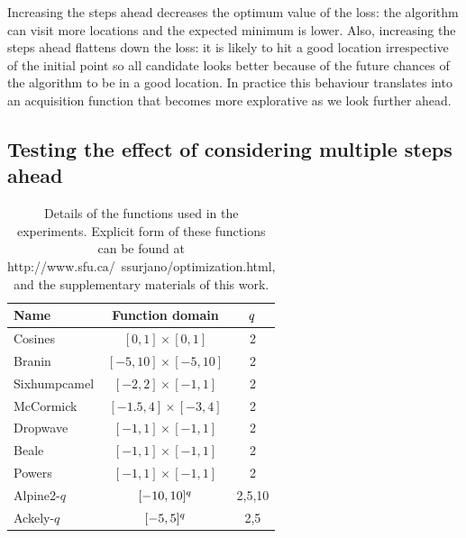\documentclass[twoside]{article}
\begin{document}
Increasing the steps ahead decreases the optimum value of the loss: the algorithm can visit more locations and the expected minimum is lower. Also, increasing the steps ahead flattens down the loss: it is likely to hit a good location irrespective of the initial point so all candidate looks better because of the future chances of the algorithm to be in a good location. In practice this behaviour translates into an acquisition function that becomes more explorative as we look further ahead. 


\subsection{Testing the effect of considering multiple steps ahead}

\begin{table}[t!]
\begin{center}
\begin{tabular}{lcc}
\toprule
Name &Function domain & $q$ \\
\midrule
Cosines & $[0,1]\times[0,1]$ & 2\\
Branin &$[-5,10]\times[-5,10]$ & 2\\
Sixhumpcamel  &$[-2,2]\times[-1,1]$ & 2\\
McCormick  & $[-1.5,4]\times[-3,4]$& 2\\
Dropwave   &$[-1,1]\times[-1,1]$ & 2\\
Beale   &$[-1,1]\times[-1,1]$ & 2\\
Powers  & $[-1,1]\times[-1,1]$& 2\\ %
Alpine2-$q$  & $[-10,10]^{q}$& 2,5,10\\
Ackely-$q$  &$[-5,5]^{q}$ & 2,5\\
\bottomrule
\end{tabular}\caption{Details of the functions used in the experiments. Explicit form of these functions can be found at http://www.sfu.ca/~ssurjano/optimization.html, \citep{Molga1995} and the supplementary materials of this work. }\label{table:test_functions}
\end{center}
\end{table}
\end{document}
